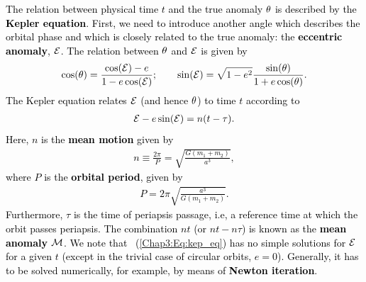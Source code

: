 \documentclass[main.tex]{subfiles}
\begin{document}
\begin{tcolorbox}[sharp corners, colback=blue!30, colframe=blue!80!blue, title=Box \ref{boxchap3:dynIII} -- Orbital Dynamics III (continued)]
\par \textcolor{black}{The relation between physical time $t$ and the true anomaly $\theta$ is described by the {\bf Kepler equation}. First, we need to introduce another angle which describes the orbital phase and which is closely related to the true anomaly: the {\bf eccentric anomaly}, $\mathcal{E}$. The relation between $\theta$ and $\mathcal{E}$ is given by
\begin{align}
\label{Chap3:Eq:EA_to_TA}
\cos(\theta) = \frac{\cos(\mathcal{E}) - e}{1 - e \cos(\mathcal{E})}; \qquad \sin(\mathcal{E}) = \sqrt{1-e^2} \frac{\sin(\theta)}{1+e\cos(\theta)}.
\end{align}
The Kepler equation relates $\mathcal{E}$ (and hence $\theta$) to time $t$ according to
\begin{align}
\label{Chap3:Eq:kep_eq}
\mathcal{E} - e \sin(\mathcal{E}) = n(t-\tau).
\end{align}
Here, $n$ is the {\bf mean motion} given by
\begin{align}
n \equiv \frac{2\pi}{P} = \sqrt{\frac{G(m_1+m_2)}{a^3}},
\end{align}
where $P$ is the {\bf orbital period}, given by
\begin{align}
\label{Chap3:Eq:kepl}
P = 2 \pi \sqrt{\frac{a^3}{G(m_1+m_2)}}.
\end{align}
Furthermore, $\tau$ is the time of periapsis passage, i.e, a reference time at which the orbit passes periapsis. The combination $n t$ (or $nt - n\tau$) is known as the {\bf mean anomaly} $\mathcal{M}$. We note that \Eq~(\ref{Chap3:Eq:kep_eq}) has no simple solutions for $\mathcal{E}$ for a given $t$ (except in the trivial case of circular orbits, $e=0$). Generally, it has to be solved numerically, for example, by means of {\bf Newton iteration}.}
\end{tcolorbox}
\end{document}
